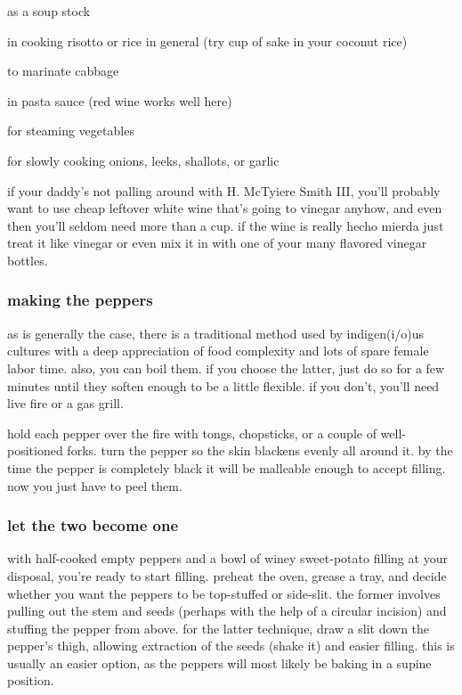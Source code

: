 \begin{ingredients}
  \item as a soup stock 
  \item in cooking risotto or rice in general (try \onehalf cup of sake in your coconut rice)
  \item to marinate cabbage
  \item in pasta sauce (red wine works well here)
  \item for steaming vegetables
  \item for slowly cooking onions, leeks, shallots, or garlic
\end{ingredients}

if your daddy's not palling around with H. McTyiere Smith III, you'll probably 
want to use cheap leftover white wine that's going to vinegar anyhow, and even 
then you'll seldom need more than a cup. if the wine is really \gls{hecho 
mierda} just treat it like vinegar 
or even mix it in with one of your many flavored vinegar bottles.

\subsubsection{making the peppers}

as is generally the case, there is a traditional method used by indigen(i/o)us 
cultures with a deep appreciation of food complexity and lots of spare female 
labor time. also, you can boil them. if you choose the latter, just do so for 
a few minutes until they soften enough to be a little flexible. if you don't, 
you'll need live fire or a gas grill.

hold each pepper over the fire with tongs, chopsticks, or a couple of 
well-positioned forks. turn the pepper so the skin blackens evenly all around 
it. by the time the pepper is completely black it will be malleable enough to 
accept filling. now you just have to peel them.

\subsubsection{let the two become one}

with half-cooked empty peppers and a bowl of winey sweet-potato filling at 
your disposal, you're ready to start filling. preheat the oven, grease a tray, 
and decide whether you want the peppers to be top-stuffed or side-slit. the 
former involves pulling out the stem and seeds (perhaps with the help of a 
circular incision) and stuffing the pepper from above. for the latter 
technique, draw a slit down the pepper's thigh, allowing extraction of the 
seeds (shake it) and easier filling. this is usually an easier option, as the 
peppers will most likely be baking in a supine position.

